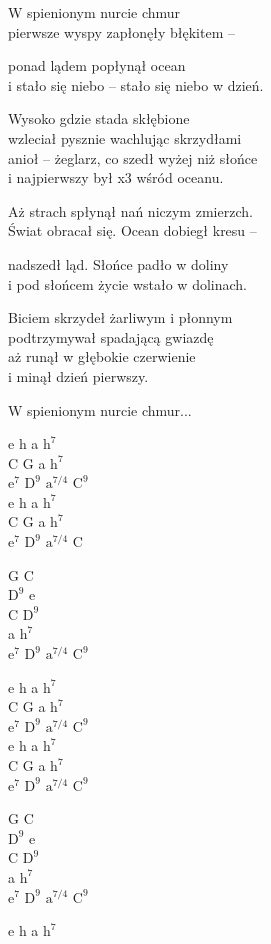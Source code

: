 \begin{text}
    W spienionym nurcie chmur\\
    pierwsze wyspy zapłonęły błękitem –

    ponad lądem popłynął ocean\\
    i stało się niebo – stało się niebo w dzień.

    \hfill\break
    Wysoko gdzie stada skłębione\\
    wzleciał pysznie wachlując skrzydłami\\
    anioł – żeglarz, co szedł wyżej niż słońce\\
    i najpierwszy był x3 wśród oceanu.

    \hfill\break
    Aż strach spłynął nań niczym zmierzch.\\
    Świat obracał się. Ocean dobiegł kresu –

    nadszedł ląd. Słońce padło w doliny\\
    i pod słońcem życie wstało w dolinach.

    \hfill\break
    Biciem skrzydeł żarliwym i płonnym\\
    podtrzymywał spadającą gwiazdę\\
    aż runął w głębokie czerwienie\\
    i minął dzień pierwszy.

    \hfill\break
    W spienionym nurcie chmur...
\end{text}
\begin{chord}
    e h a $\mathrm{h^7}$\\
    C G a $\mathrm{h^7}$\\
    $\mathrm{e^7}$ $\mathrm{D^9}$ $\mathrm{a^{7/4}}$ $\mathrm{C^9}$\\
    e h a $\mathrm{h^7}$\\
    C G a $\mathrm{h^7}$\\
    $\mathrm{e^7}$ $\mathrm{D^9}$ $\mathrm{a^{7/4}}$ C

    G C\\
    $\mathrm{D^9}$ e\\
    C $\mathrm{D^9}$\\
    a $\mathrm{h^7}$\\
    $\mathrm{e^7}$ $\mathrm{D^9}$ $\mathrm{a^{7/4}}$ $\mathrm{C^9}$

    e h a $\mathrm{h^7}$\\
    C G a $\mathrm{h^7}$\\
    $\mathrm{e^7}$ $\mathrm{D^9}$ $\mathrm{a^{7/4}}$ $\mathrm{C^9}$\\
    e h a $\mathrm{h^7}$\\
    C G a $\mathrm{h^7}$\\
    $\mathrm{e^7}$ $\mathrm{D^9}$ $\mathrm{a^{7/4}}$ $\mathrm{C^9}$

    G C\\
    $\mathrm{D^9}$ e\\
    C $\mathrm{D^9}$\\
    a $\mathrm{h^7}$\\
    $\mathrm{e^7}$ $\mathrm{D^9}$ $\mathrm{a^{7/4}}$ $\mathrm{C^9}$

    e h a $\mathrm{h^7}$
\end{chord}
